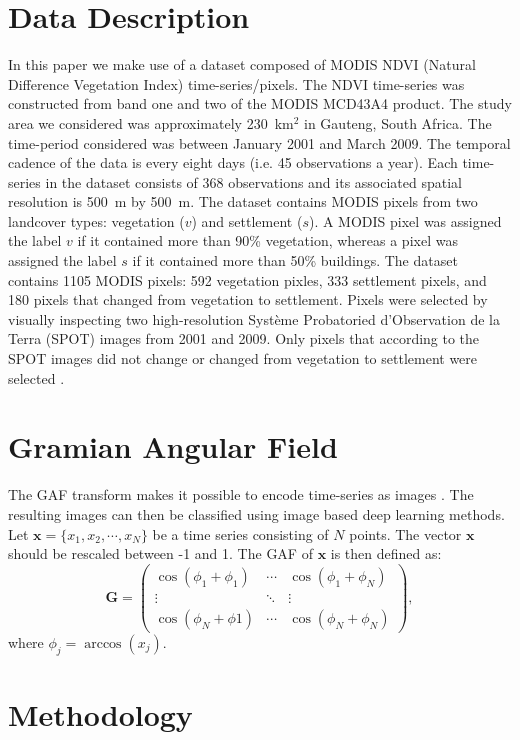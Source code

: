 \documentclass{article}
\begin{document}
\section{Data Description}
\label{sec:data}
In this paper we make use of a dataset composed of MODIS NDVI (Natural Difference Vegetation Index) time-series/pixels. The NDVI time-series was constructed from band one and two of the MODIS MCD43A4 product. The study area we considered was approximately 230~km$^2$ in Gauteng, South Africa. The time-period considered was between January 2001 and March 2009. The temporal cadence of the data is every eight days (i.e. 45 observations a year). Each time-series in the dataset consists of 368 observations and its associated spatial resolution is 500~m by 500~m. The dataset contains MODIS pixels from two landcover types: vegetation ($v$) and settlement ($s$). A MODIS pixel was assigned the label $v$ if it contained more than 90\% vegetation, whereas a pixel was assigned the label $s$ if it contained more than 50\% buildings. The dataset contains 1105 MODIS pixels: 592 vegetation pixles, 333 settlement pixels, and 180 pixels that changed from vegetation to settlement. Pixels were selected by visually inspecting two high-resolution Syst\`{e}me Probatoried d'Observation de la Terra (SPOT) images from 2001 and 2009. Only pixels that according to the SPOT images did not change or changed from vegetation to settlement were selected \cite{grobler2013}.

\section{Gramian Angular Field}
\label{sec:GAF}
The GAF transform makes it possible to encode time-series as images \cite{wang2015}. The resulting images can then be classified using image based deep learning methods. Let $\mathbf{x} = \{x_1,x_2,\cdots,x_N\}$ be a time series consisting of $N$ points. The vector $\mathbf{x}$ should be rescaled between -1 and 1. The GAF of $\mathbf{x}$ is then defined as: 
\begin{equation}
\mathbf{G} = \begin{pmatrix}
\cos(\phi_1+\phi_1) & \cdots & \cos(\phi_1+\phi_N)\\
\vdots& \ddots &\vdots\\
\cos(\phi_N+\phi1)&\cdots&\cos(\phi_N+\phi_N)
\end{pmatrix},\nonumber
\end{equation}
where $\phi_j = \arccos(x_j)$.
  
\section{Methodology}
\label{sec:exp}
\end{document}
